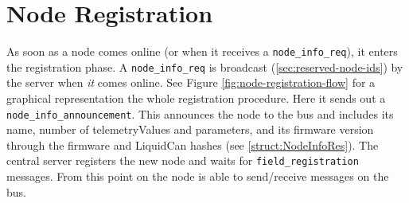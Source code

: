 \section{Node Registration}\label{sec:node-registration}
As soon as a node comes online (or when it receives a \texttt{node\_info\_req}), it enters the registration phase. A \texttt{node\_info\_req} is broadcast (\ref{sec:reserved-node-ids}) by the server when \textit{it} comes online. See Figure \ref{fig:node-registration-flow} for a graphical representation the whole registration procedure. Here it sends out a \texttt{node\_info\_announcement}.
This announces the node to the bus and includes its name, number of telemetryValues and parameters, and its firmware version through
the firmware and LiquidCan hashes (see \ref{struct:NodeInfoRes}). The central server registers the new node and waits for \texttt{field\_registration} messages. From this point on the 
node is able to send/receive messages on the bus. 